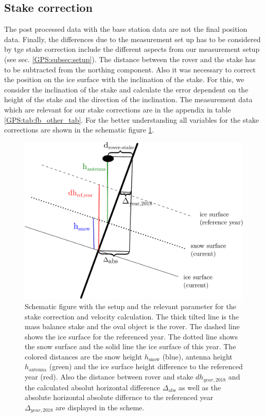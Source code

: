 \subsection{Stake correction}
The post processed data with the base station data are not the final position data. 
Finally, the differences due to the measurement set up has to be considered by tge stake correction include the different aspects from our measurement setup (see sec. \ref{GPS:subsec:setup}).
The distance between the rover and the stake has to be subtracted from the northing component.
Also it was necessary to correct the position on the ice surface with the inclination of the stake. 
For this, we consider the inclination of the stake and calculate the error dependent on the height of the stake and the direction of the inclination.
The measurement data which are relevant for our stake corrections are in the appendix in table \ref{GPS:tab:fb_other_tab}.
For the better understanding all variables for the stake corrections are shown in the schematic figure \ref{GPS:fig:scheme}.
\medskip

\begin{figure}[H]
	\centering
	\includegraphics[width=0.9\linewidth]{./figs/pictures/schematic_setup.pdf}
	\caption{Schematic figure with the setup and the relevant parameter for the stake correction and velocity calculation. The thick tilted line is the mass balance stake and the oval object is the rover. The dashed line shows the ice surface for the referenced year. The dotted line shows the snow surface and the solid line the ice surface of this year. The colored distances are the snow height $h_{\text{snow}}$ (blue), antenna height $h_{\text{antenna}}$ (green) and the ice surface height difference to the referenced year (red). Also the distance between rover and stake $dh_{year,2018}$ and the calculated absolut horizontal difference $\Delta_{\text{abs}}$ as well as the absolute horizontal absolute differnce to the referenced year $\Delta_{year,2018}$ are displayed in the scheme.}
	\label{GPS:fig:scheme}
\end{figure}


